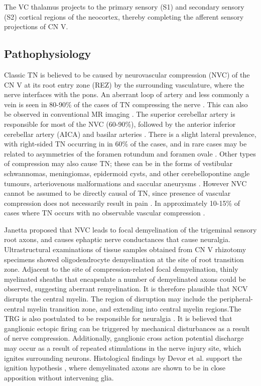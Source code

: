 The VC thalamus projects to the primary sensory (S1) and secondary sensory (S2) cortical regions of the neocortex, thereby completing the afferent sensory projections of CN V. 



\subsection{Pathophysiology}

Classic TN is believed to be caused by neurovascular compression (NVC) of the CN V at its root entry zone (REZ) by the surrounding vasculature, where the nerve interfaces with the pons. An aberrant loop of artery and less commonly a vein is seen in 80-90\% of the cases of TN compressing the nerve \cite{Love2001,McLaughlin1999}. This can also be observed in conventional MR imaging \cite{Borges2010}. The superior cerebellar artery is responsible for most of the NVC (60-90\%), followed by the anterior inferior cerebellar artery (AICA) and basilar arteries \cite{Lutz2011}. There is a slight lateral prevalence, with right-sided TN occurring in  in 60\% of the cases, and in rare cases may be related to asymmetries of the foramen rotundum and foramen ovale \cite{Toda2009}.  Other types of compression may also cause TN; these can be in the forms of vestibular schwannomas, meningiomas, epidermoid cysts, and other cerebellopontine angle tumours, arteriovenous malformations and saccular aneurysms \cite{Haller2016,Love2001}. However NVC cannot be assumed to be directly causal of TN, since presence of vascular compression does not necessarily result in pain \cite{Desouza2013,Hodaie2013}. In approximately 10-15\% of cases where TN occurs with no observable vascular compression \cite{Revuelta-Gutierrez2006,Maarbjerg2015}.


Janetta \cite{Jannetta1967} proposed that NVC leads to focal demyelination of the trigeminal sensory root axons, and causes ephaptic nerve conductances that cause neuralgia. Ultrastructural examinations \cite{Love1998} of tissue samples obtained from CN V rhizotomy specimens showed oligodendrocyte demyelination at the site of root transition zone. Adjacent to the site of compression-related focal demyelination, thinly myelinated sheaths that encapsulate a number of demyelinated axons could be observed, suggesting aberrant remyelination. It is therefore plausible that NCV disrupts the central myelin. The region of disruption may include the peripheral-central myelin transition zone, and extending into central myelin regions.The TRG is also postulated to be responsible for neuralgia \cite{Rappaport1994}. It is believed that ganglionic ectopic firing can be triggered by mechanical disturbances as a result of nerve compression. Additionally, ganglionic cross action potential discharge may occur as a result of repeated stimulations in the nerve injury site, which ignites surrounding neurons. Histological findings by Devor et al. support the ignition hypothesis \cite{Devor2002a}, where demyelinated axons are shown to be in close apposition without intervening glia.  

